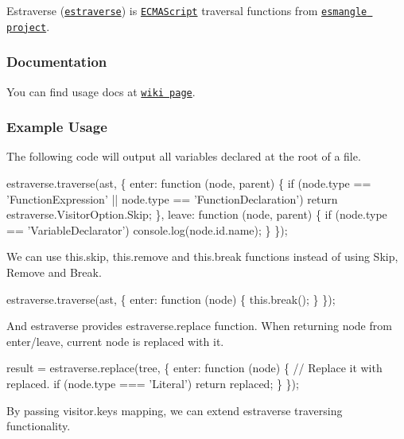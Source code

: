 Estraverse (\href{http://github.com/estools/estraverse}{\tt estraverse}) is \href{http://www.ecma-international.org/publications/standards/Ecma-262.htm}{\tt E\+C\+M\+A\+Script} traversal functions from \href{http://github.com/estools/esmangle}{\tt esmangle project}.

\subsubsection*{Documentation}

You can find usage docs at \href{https://github.com/estools/estraverse/wiki/Usage}{\tt wiki page}.

\subsubsection*{Example Usage}

The following code will output all variables declared at the root of a file.


\begin{DoxyCode}
estraverse.traverse(ast, \{
    enter: function (node, parent) \{
        if (node.type == 'FunctionExpression' || node.type == 'FunctionDeclaration')
            return estraverse.VisitorOption.Skip;
    \},
    leave: function (node, parent) \{
        if (node.type == 'VariableDeclarator')
          console.log(node.id.name);
    \}
\});
\end{DoxyCode}


We can use {\ttfamily this.\+skip}, {\ttfamily this.\+remove} and {\ttfamily this.\+break} functions instead of using Skip, Remove and Break.


\begin{DoxyCode}
estraverse.traverse(ast, \{
    enter: function (node) \{
        this.break();
    \}
\});
\end{DoxyCode}


And estraverse provides {\ttfamily estraverse.\+replace} function. When returning node from {\ttfamily enter}/{\ttfamily leave}, current node is replaced with it.


\begin{DoxyCode}
result = estraverse.replace(tree, \{
    enter: function (node) \{
        // Replace it with replaced.
        if (node.type === 'Literal')
            return replaced;
    \}
\});
\end{DoxyCode}


By passing {\ttfamily visitor.\+keys} mapping, we can extend estraverse traversing functionality.


